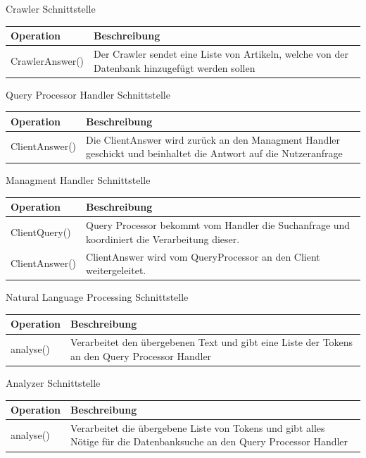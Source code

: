 \begin{interface}{40}{Crawler Schnittstelle}
\begin{tabular}[ht]{|p{4cm}|p{10cm}|}
\hline
Operation & Beschreibung\\
\hline
CrawlerAnswer() & Der Crawler sendet eine Liste von Artikeln, welche von
der Datenbank hinzugefügt werden sollen\\
\hline
\end{tabular}
\end{interface}

\begin{interface}{50}{Query Processor Handler Schnittstelle}
\begin{tabular}[ht]{|p{4cm}|p{10cm}|}
\hline
Operation & Beschreibung\\
\hline
ClientAnswer() & Die ClientAnswer wird zurück an den Managment Handler
geschickt und beinhaltet die Antwort auf die Nutzeranfrage\\
\hline
\end{tabular}
\end{interface}

\begin{interface}{60}{Managment Handler Schnittstelle}
\begin{tabular}[ht]{|p{4cm}|p{10cm}|}
\hline
Operation & Beschreibung\\
\hline
ClientQuery()  & Query Processor bekommt vom Handler die Suchanfrage und
koordiniert die Verarbeitung dieser.\\
\hline
ClientAnswer() & ClientAnswer wird vom QueryProcessor an den Client
weitergeleitet.\\
\hline
\end{tabular}
\end{interface}

\begin{interface}{70}{Natural Language Processing Schnittstelle}
\begin{tabular}[ht]{|p{4cm}|p{10cm}|}
\hline
Operation & Beschreibung\\
\hline
analyse() & Verarbeitet den übergebenen Text und gibt eine Liste der Tokens an
den Query Processor Handler\\
\hline
 \end{tabular}
\end{interface}

\begin{interface}{80}{Analyzer Schnittstelle}
\begin{tabular}[ht]{|p{4cm}|p{10cm}|}
\hline
Operation & Beschreibung\\
\hline
analyse() & Verarbeitet die übergebene Liste von Tokens und gibt alles Nötige
für die Datenbanksuche an den Query Processor Handler\\
\hline
 \end{tabular}
\end{interface}

